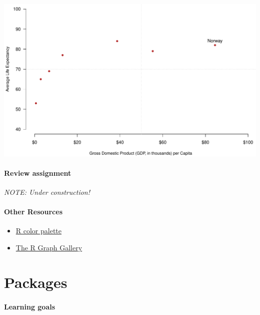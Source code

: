 \documentclass[
]{book}
\providecommand{\tightlist}{%
  \setlength{\itemsep}{0pt}\setlength{\parskip}{0pt}}
\begin{document}
\includegraphics{figures/unnamed-chunk-123-1.pdf}

\hypertarget{review-assignment-5}{%
\subsubsection*{Review assignment}\label{review-assignment-5}}

\emph{NOTE: Under construction!}

\hypertarget{other-resources-2}{%
\subsubsection*{Other Resources}\label{other-resources-2}}

\begin{itemize}
\tightlist
\item
  \href{http://www.stat.columbia.edu/~tzheng/files/Rcolor.pdf}{R color palette}\\
\item
  \href{https://www.r-graph-gallery.com/}{The R Graph Gallery}
\end{itemize}

\hypertarget{packages}{%
\chapter{Packages}\label{packages}}

\hypertarget{learning-goals-6}{%
\subsubsection*{Learning goals}\label{learning-goals-6}}
\end{document}
